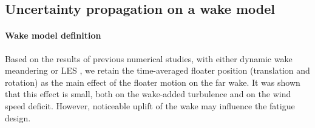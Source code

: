 \subsection{Uncertainty propagation on a wake model}\label{sec:UQ-wake}

\paragraph{Wake model definition}
Based on the results of previous numerical studies, with either dynamic wake meandering \cite{Wise2020} or LES \cite{Johlas2021}, 
we retain the time-averaged floater position (translation and rotation) as the main effect of the floater motion on the far wake. 
It was shown that this effect is small, both on the wake-added turbulence and on the wind speed deficit. 
However, noticeable uplift of the wake may influence the fatigue design. 


